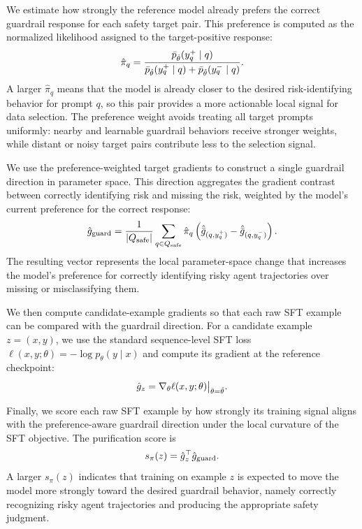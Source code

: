 We estimate how strongly the reference model already prefers the correct guardrail response for each safety target pair. This preference is computed as the normalized likelihood assigned to the target-positive response:
\begin{equation}
\small
\hat\pi_q
=
\frac{
\bar p_{\hat\theta}(y_q^{+}\mid q)
}{
\bar p_{\hat\theta}(y_q^{+}\mid q)
+
\bar p_{\hat\theta}(y_q^{-}\mid q)
}.
\label{eq:guardrail-positive-preference}
\end{equation}
A larger \(\hat\pi_q\) means that the model is already closer to the desired risk-identifying behavior for prompt \(q\), so this pair provides a more actionable local signal for data selection. The preference weight avoids treating all target prompts uniformly: nearby and learnable guardrail behaviors receive stronger weights, while distant or noisy target pairs contribute less to the selection signal.

We use the preference-weighted target gradients to construct a single guardrail direction in parameter space. This direction aggregates the gradient contrast between correctly identifying risk and missing the risk, weighted by the model's current preference for the correct response:
\begin{equation}
\small
\hat g_{\mathrm{guard}}
=
\frac{1}{|Q_{\mathrm{safe}}|}
\sum_{q\in Q_{\mathrm{safe}}}
\hat\pi_q
\left(
\hat{\bar g}_{(q,y_q^{+})}
-
\hat{\bar g}_{(q,y_q^{-})}
\right).
\label{eq:guardrail-target-direction}
\end{equation}
The resulting vector represents the local parameter-space change that increases the model's preference for correctly identifying risky agent trajectories over missing or misclassifying them.

We then compute candidate-example gradients so that each raw SFT example can be compared with the guardrail direction. For a candidate example \(z=(x,y)\), we use the standard sequence-level SFT loss \(\ell(x,y;\theta)=-\log p_\theta(y\mid x)\) and compute its gradient at the reference checkpoint:
\begin{equation}
\small
\hat g_z
=
\nabla_\theta \ell(x,y;\theta)\big|_{\theta=\hat\theta}.
\label{eq:guardrail-sft-gradient}
\end{equation}

Finally, we score each raw SFT example by how strongly its training signal aligns with the preference-aware guardrail direction under the local curvature of the SFT objective. The purification score is
\begin{equation}
\small
s_{\pi}(z)
=
\hat g_z^\top \hat g_{\mathrm{guard}}.
\label{eq:guardrail-prism-score}
\end{equation}
A larger \(s_{\pi}(z)\) indicates that training on example \(z\) is expected to move the model more strongly toward the desired guardrail behavior, namely correctly recognizing risky agent trajectories and producing the appropriate safety judgment.

